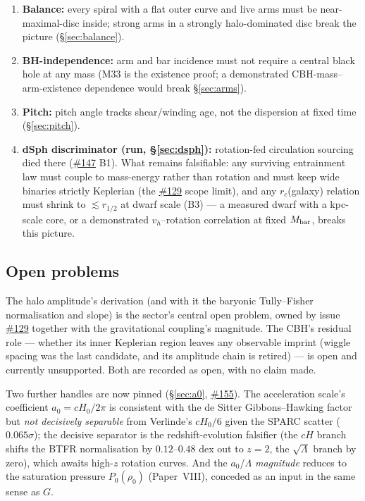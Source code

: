 \documentclass[11pt,a4paper]{article}
\providecommand{\ssvissue}[1]{\hyperref[issue:#1]{\##1}}
\begin{document}
\begin{enumerate}
  \item \textbf{Balance:} every spiral with a flat outer curve and live
    arms must be near-maximal-disc inside; strong arms in a strongly
    halo-dominated disc break the picture (\S\ref{sec:balance}).
  \item \textbf{BH-independence:} arm and bar incidence must not require
    a central black hole at any mass (M33 is the existence proof; a
    demonstrated CBH-mass--arm-existence dependence would break
    \S\ref{sec:arms}).
  \item \textbf{Pitch:} pitch angle tracks shear/winding age, not the
    dispersion at fixed time (\S\ref{sec:pitch}).
  \item \textbf{dSph discriminator (run, \S\ref{sec:dsph}):}
    rotation-fed circulation sourcing died there (\ssvissue{147} B1).
    What remains falsifiable: any surviving entrainment law must couple
    to mass-energy rather than rotation and must keep wide binaries
    strictly Keplerian (the \ssvissue{129} scope limit), and any
    $r_c$(galaxy) relation must shrink to $\lesssim r_{1/2}$ at dwarf
    scale (B3) --- a measured dwarf with a kpc-scale core, or a
    demonstrated $v_h$--rotation correlation at fixed $M_{\rm bar}$,
    breaks this picture.
\end{enumerate}

\subsection{Open problems}

The halo amplitude's derivation (and with it the baryonic Tully--Fisher
normalisation and slope) is the sector's central open problem, owned by
issue \ssvissue{129} together with the gravitational coupling's
magnitude.  The CBH's residual role --- whether its inner Keplerian
region leaves any observable imprint (wiggle spacing was the last
candidate, and its amplitude chain is retired) --- is open and currently
unsupported.  Both are recorded as open, with no claim made.

Two further handles are now pinned (\S\ref{sec:a0}, \ssvissue{155}). The
acceleration scale's coefficient $a_0=cH_0/2\pi$ is consistent with the
de Sitter Gibbons--Hawking factor but \emph{not decisively separable}
from Verlinde's $cH_0/6$ given the SPARC scatter ($0.065\sigma$); the
decisive separator is the redshift-evolution falsifier (the $cH$ branch
shifts the BTFR normalisation by $0.12$--$0.48$ dex out to $z=2$, the
$\sqrt\Lambda$ branch by zero), which awaits high-$z$ rotation curves.
And the $a_0$/$\Lambda$ \emph{magnitude} reduces to the saturation
pressure $P_0(\rho_0)$ (Paper~VIII), conceded as an input in the same
sense as $G$.
\end{document}
